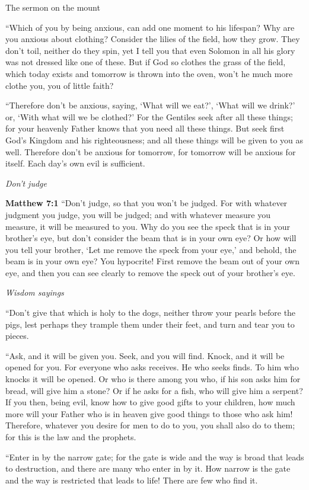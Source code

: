 \documentclass[10pt,twoside]{article} %
\newcommand{\quotesize}{\normalsize{}}
\newenvironment{quotetext}{\begingroup\quotesize}{\endgroup}
\newcommand{\bible}[2]{\begin{quotetext}\textbf{#1} #2\end{quotetext}}
\newcommand{\matthew}[2]{\bible{Matthew #1}{#2}}
\newcommand{\subhead}[1]{\emph{#1}\par}
\begin{document}
\begin{section}{The sermon on the mount}
{   ``Which of you by being anxious, can add one moment to his lifespan?    Why are you anxious about clothing? Consider the lilies of the field, how they grow. They don't toil, neither do they spin,    yet I tell you that even Solomon in all his glory was not dressed like one of these.    But if God so clothes the grass of the field, which today exists and tomorrow is thrown into the oven, won't he much more clothe you, you of little faith?

   ``Therefore don't be anxious, saying, `What will we eat?', `What will we drink?' or, `With what will we be clothed?'    For the Gentiles seek after all these things; for your heavenly Father knows that you need all these things.    But seek first God's Kingdom and his righteousness; and all these things will be given to you as well.    Therefore don't be anxious for tomorrow, for tomorrow will be anxious for itself. Each day's own evil is sufficient. 
}

\subhead{Don't judge}

\matthew{7:1}{
    ``Don't judge, so that you won't be judged.    For with whatever judgment you judge, you will be judged; and with whatever measure you measure, it will be measured to you.    Why do you see the speck that is in your brother's eye, but don't consider the beam that is in your own eye?    Or how will you tell your brother, `Let me remove the speck from your eye,' and behold, the beam is in your own eye?    You hypocrite! First remove the beam out of your own eye, and then you can see clearly to remove the speck out of your brother's eye.

\subhead{Wisdom sayings}

   ``Don't give that which is holy to the dogs, neither throw your pearls before the pigs, lest perhaps they trample them under their feet, and turn and tear you to pieces.

   ``Ask, and it will be given you. Seek, and you will find. Knock, and it will be opened for you.    For everyone who asks receives. He who seeks finds. To him who knocks it will be opened.    Or who is there among you who, if his son asks him for bread, will give him a stone?    Or if he asks for a fish, who will give him a serpent?    If you then, being evil, know how to give good gifts to your children, how much more will your Father who is in heaven give good things to those who ask him!    Therefore, whatever you desire for men to do to you, you shall also do to them; for this is the law and the prophets.

   ``Enter in by the narrow gate; for the gate is wide and the way is broad that leads to destruction, and there are many who enter in by it.    How narrow is the gate and the way is restricted that leads to life! There are few who find it.

}
\end{section}
\end{document}
